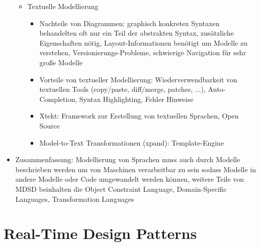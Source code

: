 \documentclass[paper=a4, fontsize=11pt]{scrartcl} %
\numberwithin{equation}{section} %
\numberwithin{figure}{section} %
\numberwithin{table}{section} %
\begin{document}
\begin{itemize}
\begin{itemize}
\begin{itemize}
    \end{itemize}
    \item Textuelle Modellierung
    \begin{itemize}
      \item Nachteile von Diagrammen: graphisch konkretex Syntaxen behandelten oft nur ein Teil der abstrakten Syntax, zusätzliche Eigenschaften nötig, Layout-Informationen benötigt um Modelle zu verstehen, Versionierungs-Probleme, schwierige Navigation für sehr große Modelle
      \item Vorteile von textueller Modellierung: Wiederverwendbarkeit von textuellen Tools (copy/paste, diff/merge, patches, ...), Auto-Completion, Syntax Highlighting, Fehler Hinweise
      \item Xtekt: Framework zur Erstellung von textuellen Sprachen, Open Source
      \item Model-to-Text Transformationen (xpand): Template-Engine
    \end{itemize}
  \end{itemize}
  \item Zusammenfassung: Modellierung von Sprachen muss auch durch Modelle beschrieben werden um von Maschinen verarbeitbar zu sein sodass Modelle in andere Modelle oder Code umgewandelt werden können, weitere Teile von MDSD beinhalten die Object Constraint Language, Domain-Specific Languages, Transformation Languages
\end{itemize}

\section{Real-Time Design Patterns}
\end{document}
